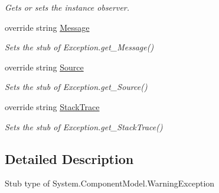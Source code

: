 \begin{DoxyCompactItemize}
\begin{DoxyCompactList}\small\item\em Gets or sets the instance observer.\end{DoxyCompactList}\item 
override string \hyperlink{class_system_1_1_component_model_1_1_fakes_1_1_stub_warning_exception_a837332eb84ef3a8b9b02249e2b5911bd}{Message}
\begin{DoxyCompactList}\small\item\em Sets the stub of Exception.\-get\-\_\-\-Message()\end{DoxyCompactList}\item 
override string \hyperlink{class_system_1_1_component_model_1_1_fakes_1_1_stub_warning_exception_a95c34d123a793dcdaa46eec33b50b8d6}{Source}
\begin{DoxyCompactList}\small\item\em Sets the stub of Exception.\-get\-\_\-\-Source()\end{DoxyCompactList}\item 
override string \hyperlink{class_system_1_1_component_model_1_1_fakes_1_1_stub_warning_exception_a346680ff8e167175cb8bd39eba253463}{Stack\-Trace}
\begin{DoxyCompactList}\small\item\em Sets the stub of Exception.\-get\-\_\-\-Stack\-Trace()\end{DoxyCompactList}\end{DoxyCompactItemize}


\subsection{Detailed Description}
Stub type of System.\-Component\-Model.\-Warning\-Exception



